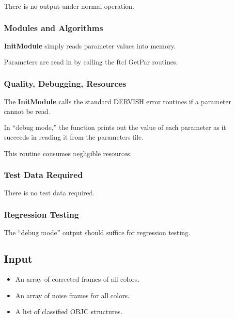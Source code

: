   There is no output under normal operation.
 
\subsubsection {Modules and Algorithms}
 
  {\bf InitModule} simply reads parameter values into memory.
 
  Parameters are read in by calling the ftcl GetPar routines.
 
\subsubsection {Quality, Debugging, Resources}
 
  The {\bf InitModule} calls the standard DERVISH error routines if a
parameter cannot be read.
 
  In ``debug mode,'' the function prints out the value of
each parameter as it succeeds in reading it from the parameters file.
 
  This routine consumes negligible resources.
 
\subsubsection {Test Data Required}
 
  There is no test data required.
 
\subsubsection {Regression Testing}
 
  The ``debug mode'' output should suffice for regression testing.
 
\subsection{Input}
 
\begin{itemize}
 
\item An array of corrected frames of all colors.
 
\item An array of noise frames for all colors.
 
\item A list of classified OBJC structures.
 
\end{itemize}
 
